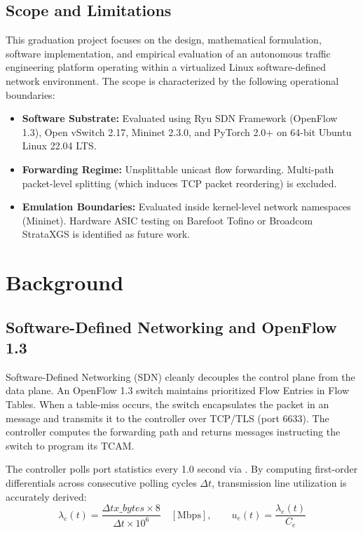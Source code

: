 \documentclass[12pt,a4paper,oneside]{report}
\begin{document}
\section{Scope and Limitations}
This graduation project focuses on the design, mathematical formulation, software implementation, and empirical evaluation of an autonomous traffic engineering platform operating within a virtualized Linux software-defined network environment.
The scope is characterized by the following operational boundaries:
\begin{itemize}
    \item \textbf{Software Substrate:} Evaluated using Ryu SDN Framework (OpenFlow 1.3), Open vSwitch 2.17, Mininet 2.3.0, and PyTorch 2.0+ on 64-bit Ubuntu Linux 22.04 LTS.
    \item \textbf{Forwarding Regime:} Unsplittable unicast flow forwarding. Multi-path packet-level splitting (which induces TCP packet reordering) is excluded.
    \item \textbf{Emulation Boundaries:} Evaluated inside kernel-level network namespaces (Mininet). Hardware ASIC testing on Barefoot Tofino or Broadcom StrataXGS is identified as future work.
\end{itemize}

\clearpage

\chapter{Background}
\label{chap:background}

\section{Software-Defined Networking and OpenFlow 1.3}
Software-Defined Networking (SDN) cleanly decouples the control plane from the data plane. An OpenFlow 1.3 switch maintains prioritized Flow Entries in Flow Tables. When a table-miss occurs, the switch encapsulates the packet in an  message and transmits it to the controller over TCP/TLS (port 6633). The controller computes the forwarding path and returns  messages instructing the switch to program its TCAM.

The controller polls port statistics every 1.0 second via . By computing first-order differentials across consecutive polling cycles $\Delta t$, transmission line utilization is accurately derived:
\begin{equation}
\lambda_e(t) = \frac{\Delta tx\_bytes \times 8}{\Delta t \times 10^6} \quad [\text{Mbps}], \qquad u_e(t) = \frac{\lambda_e(t)}{C_e}
\end{equation}
\end{document}
